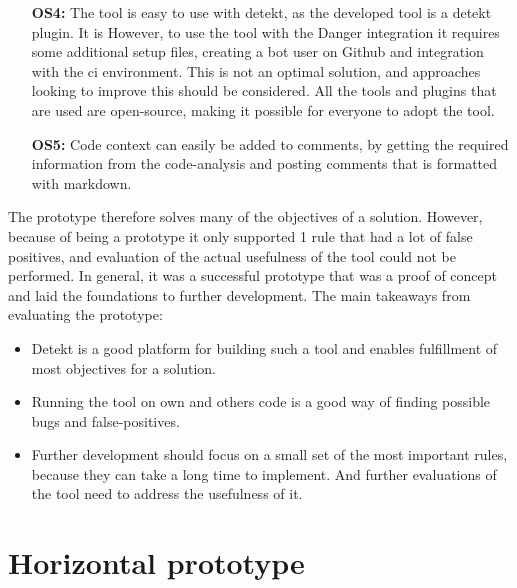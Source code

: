 \documentclass{report}
\begin{document}
\begin{itemize}
    \item [\textbf{OS4:}] The tool is easy to use with detekt, as the developed tool is a detekt plugin. It is However, to use the tool with the Danger integration it requires some additional setup files, creating a bot user on Github and integration with the \gls{ci} environment. This is not an optimal solution, and approaches looking to improve this should be considered. All the tools and plugins that are used are open-source, making it possible for everyone to adopt the tool.
    
    \item [\textbf{OS5:}] Code context can easily be added to comments, by getting the required information from the code-analysis and posting comments that is formatted with markdown.

\end{itemize}

The prototype therefore solves many of the objectives of a solution. However, because of being a prototype it only supported 1 rule that had a lot of false positives, and evaluation of the actual usefulness of the tool could not be performed. In general, it was a successful prototype that was a proof of concept and laid the foundations to further development. The main takeaways from evaluating the prototype:
\begin{itemize}
    \item Detekt is a good platform for building such a tool and enables fulfillment of most objectives for a solution.
    \item Running the tool on own and others code is a good way of finding possible bugs and false-positives.
    \item Further development should focus on a small set of the most important rules, because they can take a long time to implement. And further evaluations of the tool need to address the usefulness of it.
\end{itemize}

\section{Horizontal prototype}
\end{document}
